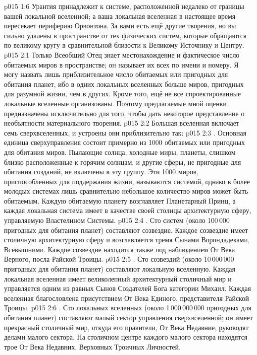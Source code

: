 \vs p015 1:6 Урантия принадлежит к системе, расположенной недалеко от границы вашей локальной вселенной; а ваша локальная вселенная в настоящее время пересекает периферию Орвонтона. За вами есть ещё другие творения, но вы сильно удалены в пространстве от тех физических систем, которые обращаются по великому кругу в сравнительной близости к Великому Источнику и Центру.
\vs p015 2:1 Только Всеобщий Отец знает местонахождение и фактическое число обитаемых миров в пространстве; он называет их всех по имени и номеру. Я могу назвать лишь приблизительное число обитаемых или пригодных для обитания планет, ибо в одних локальных вселенных больше миров, пригодных для разумной жизни, чем в других. Кроме того, ещё не все спроектированные локальные вселенные организованы. Поэтому предлагаемые мной оценки предназначены исключительно для того, чтобы дать некоторое представление о необъятности материального творения.
\vs p015 2:2 \pc Большая вселенная включает семь сверхвселенных, и устроены они приблизительно так:
\vs p015 2:3 . Основная единица сверхуправления состоит примерно из 1000 обитаемых или пригодных для обитания миров. Пылающие солнца, холодные миры, планеты, слишком близко расположенные к горячим солнцам, и другие сферы, не пригодные для обитания созданий, не включены в эту группу. Эти 1000 миров, приспособленных для поддержания жизни, называются системой, однако в более молодых системах лишь сравнительно небольшое количество миров может быть обитаемым. Каждую обитаемую планету возглавляет Планетарный Принц, а каждая локальная система имеет в качестве своей столицы архитектурную сферу, управляемую Властелином Системы.
\vs p015 2:4 . Сто систем (около 100\,000 пригодных для обитания планет) составляют созвездие. Каждое созвездие имеет столичную архитектурную сферу и возглавляется тремя Сынами Ворондадеками, Всевышними. Каждое созвездие находится также под наблюдением От Века Верного, посла Райской Троицы.
\vs p015 2:5 . Сто созвездий (около 10\,000\,000 пригодных для обитания планет) составляют локальную вселенную. Каждая локальная вселенная имеет великолепный архитектурный столичный мир и управляется одним из равных Сынов Создателей Бога категории Михаил. Каждая вселенная благословлена присутствием От Века Единого, представителя Райской Троицы.
\vs p015 2:6 . Сто локальных вселенных (около 1\,000\,000\,000 пригодных для обитания планет) составляют малый сектор управления сверхвселенной; он имеет прекрасный столичный мир, откуда его правители, От Века Недавние, руководят делами малого сектора. На столичном центре каждого малого сектора находятся трое От Века Недавних, Верховных Троичных Личностей.
